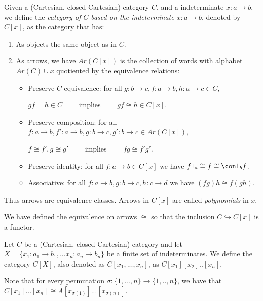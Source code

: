 \begin{definition}\cite[Part I, Chapter 5]{lambek1988introduction}
  Given a (Cartesian, closed Cartesian) category $C$, and a indeterminate $x: a \to b$, we define the \emph{category of $C$ based on the indeterminate $x:a\to b$}, denoted by $C[x]$, as the category that has:
  \begin{enumerate}
  \item As objects the same object as in $C$.
  \item As arrows, we have $Ar(C[x])$ is the collection of words with alphabet $Ar(C) \cup {x}$ quotiented by the equivalence relations:
    \begin{itemize}
    \item Preserve   $C$-equivalence: for all $g:b\to c,f:a\to b, h: a\to c\in C$,
      \begin{center}
        $gf=h \in C\qquad $ implies $\qquad gf \cong h\in C[x].$
      \end{center}

    \item Preserve composition: for all $f:a\to b,f':a\to b,g:b\to c,g': b \to c\in Ar(C[x])$,
      \begin{center}
        $f\cong f', g\cong g'\qquad$ implies $\qquad fg\cong f'g'$.
      \end{center}
      
    \item Preserve identity: for all $f:a\to b\in C[x]$ we have $f1_a\cong f \cong \con 1_bf$.
    \item Associative: for all $f:a\to b, g:b\to c, h: c\to d$ we have $(fg)h\cong f(gh)$.
    \end{itemize}
  \end{enumerate}
  Thus arrows are equivalence classes. Arrows in $C[x]$ are called \emph{polynomials} in $x$.
\end{definition}
\begin{remark}
We have defined the equivalence on arrows $\cong$ so that the inclusion $C\hookrightarrow C[x]$ is a functor.
\end{remark}
\begin{definition}
  Let $C$ be a (Cartesian, closed Cartesian) category and let $X=\{x_1:a_1 \to b_1, ... x_n:a_n \to b_n\}$ be a finite  set of indeterminates. We define the category $C[X]$, also denoted as $C[x_1,...,x_n]$, as $C[x_1][x_2]..[x_n]$.
\end{definition}
\begin{remark}
  Note that for every permutation $\sigma : \{1,...,n\}\to \{1,..,n\}$, we have that $C[x_1]...[x_n]\cong A[x_{\sigma(1)}]...[x_{\sigma(n)}]$. 
\end{remark}

